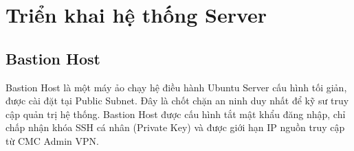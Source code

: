 \documentclass[12pt, a4paper]{article}
\begin{document}

\section{Triển khai hệ thống Server}

\subsection{Bastion Host}
Bastion Host là một máy ảo chạy hệ điều hành Ubuntu Server cấu hình tối giản, được cài đặt tại Public Subnet. Đây là chốt chặn an ninh duy nhất để kỹ sư truy cập quản trị hệ thống. Bastion Host được cấu hình tắt mật khẩu đăng nhập, chỉ chấp nhận khóa SSH cá nhân (Private Key) và được giới hạn IP nguồn truy cập từ CMC Admin VPN.
\end{document}
